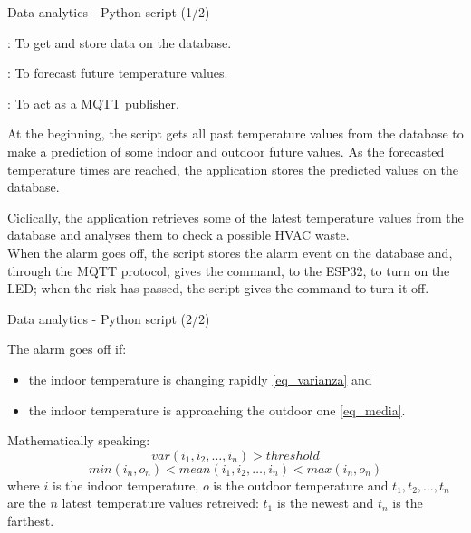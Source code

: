 \documentclass{beamer}
\begin{document}
\begin{frame}{Data analytics -  Python script (1/2)}

	\begin{description}[\texttt{influxdb-client}]		%
		\item[\texttt{influxdb-client}]: To get and store data on the database.
		\item[\texttt{prophet}]: To forecast future temperature values.
		\item[\texttt{paho-mqtt}]: To act as a MQTT publisher.
	\end{description}

	\vfill

	At the beginning, the script gets all past temperature values from the database to make a prediction of some indoor and outdoor future values. As the forecasted temperature times are reached, the application stores the predicted values on the database.
	
	\vfill
	
	Ciclically, the application retrieves some of the latest temperature values from the database and analyses them to check a possible HVAC waste.\\
	When the alarm goes off, the script stores the alarm event on the database and, through the MQTT protocol, gives the command, to the ESP32, to turn on the LED; when the risk has passed, the script gives the command to turn it off.

\end{frame}


\begin{frame}{Data analytics -  Python script (2/2)}

	The alarm goes off if:
	\begin{itemize}
		\item the indoor temperature is changing rapidly \eqref{eq_varianza} and
		\item the indoor temperature is approaching the outdoor one \eqref{eq_media}.
	\end{itemize}
	
	\vfill
	
	Mathematically speaking:
	\begin{equation}
	var(i_1, i_2, \dots, i_n) > threshold \label{eq_varianza}
	\end{equation}
	\begin{equation}
	min(i_n, o_n) < mean(i_1, i_2, \dots, i_n) < max(i_n, o_n) \label{eq_media}
	\end{equation}
	where $i$ is the indoor temperature, $o$ is the outdoor temperature and $t_1, t_2, \dots, t_n$ are the $n$ latest temperature values retreived: $t_1$ is the newest and $t_n$ is the farthest.

\end{frame}
\end{document}
